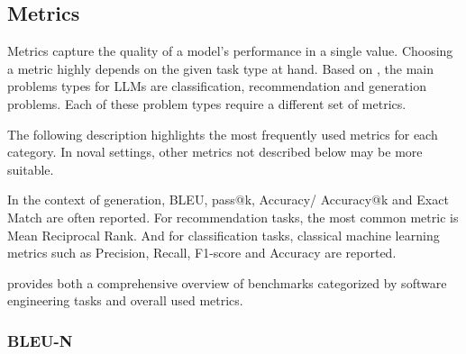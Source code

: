 \documentclass[11pt]{article}
\begin{document}
\subsection{Metrics}
Metrics capture the quality of a model's performance in a single value.
Choosing a metric highly depends on the given task type at hand.
Based on \cite{10.1145/3695988}, the main problems types for LLMs are classification, recommendation and generation problems.
Each of these problem types require a different set of metrics.

The following description highlights the most frequently used metrics for each category.
In noval settings, other metrics not described below may be more suitable. %

In the context of generation, BLEU, pass@k, Accuracy/ Accuracy@k and Exact Match are often reported.
For recommendation tasks, the most common metric is Mean Reciprocal Rank.
And for classification tasks, classical machine learning metrics such as Precision, Recall, F1-score and Accuracy are reported.

\cite{10.1145/3695988} provides both a comprehensive overview of benchmarks categorized by software engineering tasks and overall used metrics.



\subsubsection{BLEU-N}
\end{document}
